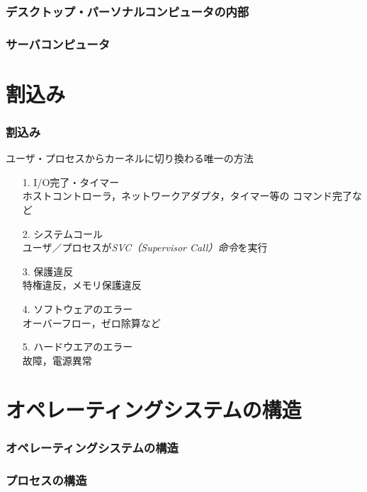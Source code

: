 \documentclass[handout]{beamer}                   %
\begin{document}
\begin{frame}
  \frametitle{デスクトップ・パーソナルコンピュータの内部}
\end{frame}

\begin{frame}
  \frametitle{サーバコンピュータ}
\end{frame}

\section{割込み}
\begin{frame}
  \frametitle{割込み}
  ユーザ・プロセスからカーネルに切り換わる唯一の方法
  \begin{enumerate}
    \item[1.] I/O完了・タイマー \\
      ホストコントローラ，ネットワークアダプタ，タイマー等の
      コマンド完了など
    \item[2.] システムコール \\
      ユーザ／プロセスが\emph{SVC（Supervisor Call）命令}を実行
    \item[3.] 保護違反 \\
      特権違反，メモリ保護違反
    \item[4.] ソフトウェアのエラー \\
      オーバーフロー，ゼロ除算など
    \item[5.] ハードウエアのエラー \\
      故障，電源異常
  \end{enumerate}
  \vfill
\end{frame}

\section{オペレーティングシステムの構造}
\begin{frame}
  \frametitle{オペレーティングシステムの構造}
\end{frame}

\begin{frame}
  \frametitle{プロセスの構造}
\end{frame}
\end{document}

